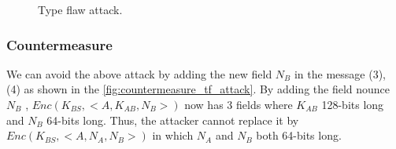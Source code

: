 \begin{figure}
\begin{tikzpicture}[x=0.6pt,y=0.75pt,yscale=-1,xscale=0.8]
    \end{tikzpicture}

    \caption{Type flaw attack.}\label{fig:type_flaw_attack}

\end{figure}


\subsubsection*{Countermeasure}
We can avoid the above attack by adding the new field \(N_B\) in the message (3), (4)
as shown in the \autoref{fig:countermeasure_tf_attack}. By adding the field nounce \(N_B\)
, \(Enc(K_{BS},<A,K_{AB},N_B>)\) now has 3 fields where \(K_{AB}\) 128-bits long and \(
N_B\) 64-bits long. Thus, the attacker cannot replace it by \(Enc(K_{BS},<A,N_A,N_B>)\)
in which \(N_A\) and \(N_B\) both 64-bits long.

